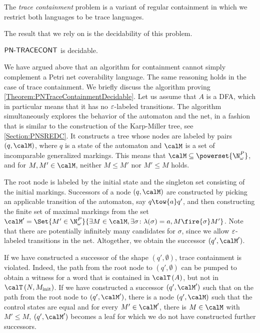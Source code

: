 \documentclass[../../diss.tex]{subfiles}
\begin{document}
The \emph{trace containment} problem is a variant of regular containment in which we restrict both languages to be trace languages.

\begin{problem}
    \problemshort{($\TRACECONT$)}
\end{problem}

The result that we rely on is the decidability of this problem.

\begin{theorem}%
\label{Theorem:PNTraceContainmentDecidable}%
    $\TRACECONT$ is decidable.
\end{theorem}

We have argued above that an algorithm for containment cannot simply complement a Petri net coverability language.
The same reasoning holds in the case of trace containment.
We briefly discuss the algorithm proving \cref{Theorem:PNTraceContainmentDecidable}.
Let us assume that $A$ is a DFA, which in particular means that it has no $\varepsilon$-labeled transitions.
The algorithm simultaneously explores the behavior of the automaton and the net, in a fashion that is similar to the construction of the Karp-Miller tree, see \cref{Section:PNSREDC}.
It constructs a tree whose nodes are labeled by pairs $(q,\calM)$, where $q$ is a state of the automaton and $\calM$ is a set of incomparable generalized markings.
This means that $\calM \subseteq \powerset{\N_\omega^P}$, and for $M,M' \in \calM$, neither $M \leq M'$ nor $M' \leq M$ holds.

The root node is labeled by the initial state and the singleton set consisting of the initial markings.
Successors of a node $(q,\calM)$ are constructed by picking an applicable transition of the automaton, say $q \tow{a} q'$, and then constructing the finite set of maximal markings from the set $\calM' = \Set{ M' \in \N_\omega^P}{ \exists M \in \calM, \exists \sigma \colon \lambda(\sigma) = a, M \fire{\sigma} M'}$.
Note that there are potentially infinitely many candidates for $\sigma$, since we allow $\varepsilon$-labeled transitions in the net.
Altogether, we obtain the successor $(q',\calM')$.

If we have constructed a successor of the shape $(q',  \emptyset)$, trace containment is violated.
Indeed, the path from the root node to $(q',  \emptyset)$ can be pumped to obtain a witness for a word that is contained in $\Traces{A}$, but not in $\Traces{N,\Minit}$.
If we have constructed a successor $(q',\calM')$ such that on the path from the root node to $(q',\calM')$, there is a node $(q',\calM)$ such that the control states are equal and for every $M' \in \calM'$, there is $M \in \calM$ with $M' \leq M$, $(q',\calM')$ becomes a leaf for which we do not have constructed further successors.
\end{document}
